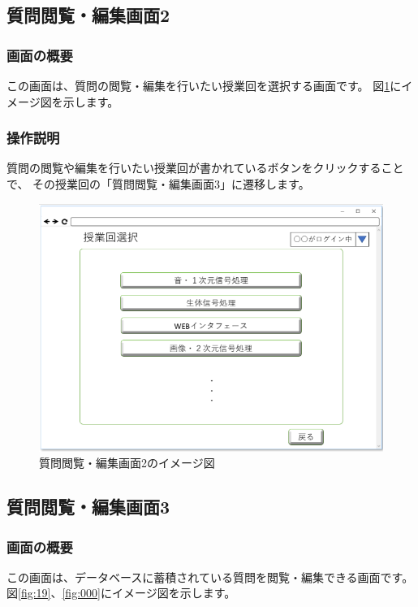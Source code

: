 \newpage

\subsection{質問閲覧・編集画面2}
\subsubsection{画面の概要}
この画面は、質問の閲覧・編集を行いたい授業回を選択する画面です。
図\ref{fig:18}にイメージ図を示します。

\subsubsection{操作説明}
質問の閲覧や編集を行いたい授業回が書かれているボタンをクリックすることで、
その授業回の「質問閲覧・編集画面3」に遷移します。

\begin{figure}[htbp]
  \begin{center}
    \includegraphics[width=0.7\linewidth,clip]{./img/18.png}
    \caption{質問閲覧・編集画面2のイメージ図}\label{fig:18}
  \end{center}
\end{figure}

\newpage

\subsection{質問閲覧・編集画面3}
\subsubsection{画面の概要}
この画面は、データベースに蓄積されている質問を閲覧・編集できる画面です。
図\ref{fig:19}、\ref{fig:000}にイメージ図を示します。

